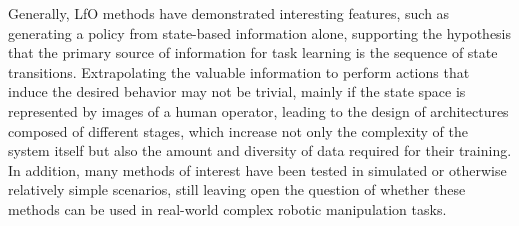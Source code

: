 Generally, LfO methods have demonstrated interesting features, such as generating a policy from state-based information alone, supporting the hypothesis that the primary source of information for task learning is the sequence of state transitions. Extrapolating the valuable information to perform actions that induce the desired behavior may not be trivial, mainly if the state space is represented by images of a human operator, leading to the design of architectures composed of different stages, which increase not only the complexity of the system itself but also the amount and diversity of data required for their training. In addition, many methods of interest have been tested in simulated or otherwise relatively simple scenarios, still leaving open the question of whether these methods can be used in real-world complex robotic manipulation tasks.